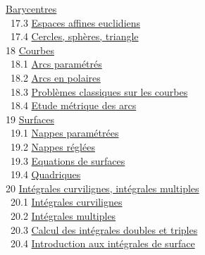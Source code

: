 \documentclass[]{article}
\begin{document}
\href{coursse93.html\#x113-51700017.2}{Barycentres} \\ ~17.3
\href{coursse94.html\#x114-52200017.3}{Espaces affines euclidiens} \\
~17.4 \href{coursse95.html\#x115-52900017.4}{Cercles, sphères, triangle}
\\ 18 \href{coursch19.html\#x116-53300018}{Courbes} \\ ~18.1
\href{coursse96.html\#x117-53400018.1}{Arcs paramétrés} \\ ~18.2
\href{coursse97.html\#x118-54500018.2}{Arcs en polaires} \\ ~18.3
\href{coursse98.html\#x119-55100018.3}{Problèmes classiques sur les
courbes} \\ ~18.4 \href{coursse99.html\#x120-55600018.4}{Etude métrique
des arcs} \\ 19 \href{coursch20.html\#x121-56600019}{Surfaces} \\ ~19.1
\href{coursse100.html\#x122-56700019.1}{Nappes paramétrées} \\ ~19.2
\href{coursse101.html\#x123-57400019.2}{Nappes réglées} \\ ~19.3
\href{coursse102.html\#x124-57800019.3}{Equations de surfaces} \\ ~19.4
\href{coursse103.html\#x125-58300019.4}{Quadriques} \\ 20
\href{coursch21.html\#x126-58800020}{Intégrales curvilignes, intégrales
multiples} \\ ~20.1 \href{coursse104.html\#x127-58900020.1}{Intégrales
curvilignes} \\ ~20.2 \href{coursse105.html\#x128-59300020.2}{Intégrales
multiples} \\ ~20.3 \href{coursse106.html\#x129-59800020.3}{Calcul des
intégrales doubles et triples} \\ ~20.4
\href{coursse107.html\#x130-60300020.4}{Introduction aux intégrales de
surface}
\end{document}

